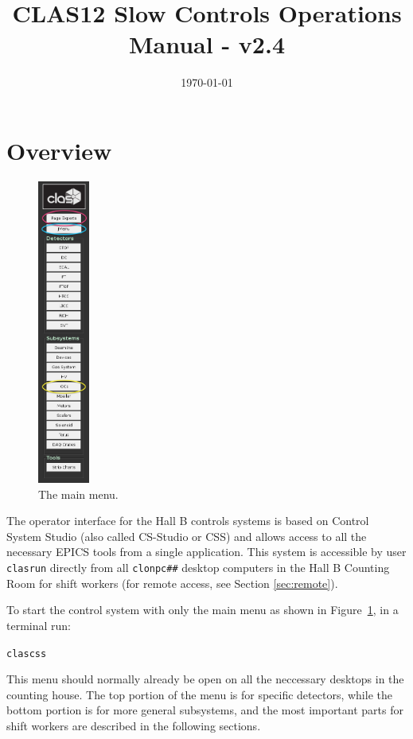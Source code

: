\documentclass[amsmath,amssymb,notitlepage,11pt]{revtex4}
\begin{document}
\title{CLAS12 Slow Controls Operations Manual - v2.4}
\date{\today}
\begin{abstract}
\end{abstract}

\maketitle
\tableofcontents
\newpage

\section{Overview}

\begin{figure}\centering\vspace{1cm}
  \includegraphics[width=0.15\textwidth]{pics/mainmenu}
  \caption{The main menu.\label{fig:mainmenu}}
\end{figure}

The operator interface for the Hall B controls systems is based on Control System Studio (also called CS-Studio or CSS) and allows access to all the necessary EPICS tools from a single application.  This system is accessible by user \texttt{clasrun} directly from all \texttt{clonpc\#\#} desktop computers in the Hall B Counting Room for shift workers (for remote access, see Section \ref{sec:remote}).


To start the control system with only the main menu as shown in Figure~\ref{fig:mainmenu}, in a terminal run: \begin{center}\texttt{clascss}\end{center}  This menu should normally already be open on all the neccessary desktops in the counting house.  The top portion of the menu is for specific detectors, while the bottom portion is for more general subsystems, and the most important parts for shift workers are described in the following sections.
\end{document}
